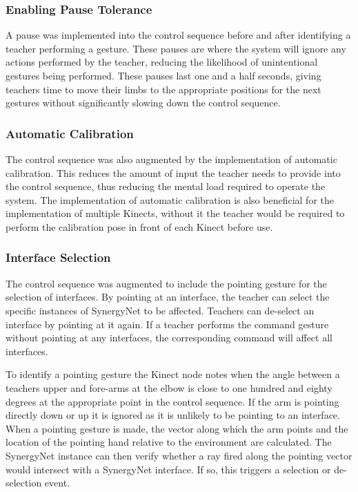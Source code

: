 \documentclass[link]{IWCOMP}
\begin{document}
\subsubsection{Enabling Pause Tolerance}  
\label{subsubsec:studyImplementationPauseTolerance}

A pause was implemented into the control sequence before and after identifying a teacher performing a gesture.
These pauses are where the system will ignore any actions performed by the teacher, reducing the likelihood of unintentional gestures being performed.
These pauses last one and a half seconds, giving teachers time to move their limbs to the appropriate positions for the next gestures without significantly slowing down the control sequence.

\subsubsection{Automatic Calibration}  
\label{subsubsec:studyImplementationAutoCalibration}

The control sequence was also augmented by the implementation of automatic calibration.
This reduces the amount of input the teacher needs to provide into the control sequence, thus reducing the mental load required to operate the system.
The implementation of automatic calibration is also beneficial for the implementation of multiple Kinects, without it the teacher would be required to perform the calibration pose in front of each Kinect before use.

\subsubsection{Interface Selection}  
\label{subsubsec:studyImplementationInterfaceSelection}

The control sequence was augmented to include the pointing gesture for the selection of interfaces.
By pointing at an interface, the teacher can select the specific instances of SynergyNet to be affected.
Teachers can de-select an interface by pointing at it again.
If a teacher performs the command gesture without pointing at any interfaces, the corresponding command will affect all interfaces.

To identify a pointing gesture the Kinect node notes when the angle between a teachers upper and fore-arms at the elbow is close to one hundred and eighty degrees at the appropriate point in the control sequence.
If the arm is pointing directly down or up it is ignored as it is unlikely to be pointing to an interface.
When a pointing gesture is made, the vector along which the arm points and the location of the pointing hand relative to the environment are calculated.
The SynergyNet instance can then verify whether a ray fired along the pointing vector would intersect with a SynergyNet interface.
If so, this triggers a selection or de-selection event.
\end{document}
